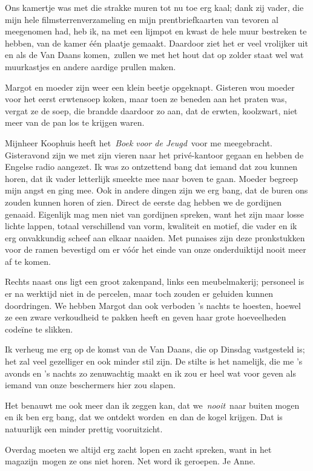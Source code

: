 \documentclass{book}
\begin{document}
Ons kamertje was met die strakke muren tot nu toe erg kaal; dank zij vader, die
mijn hele filmsterrenverzameling en mijn prentbriefkaarten van tevoren al
meegenomen had, heb ik, na met een lijmpot en kwast de hele muur bestreken te
hebben, van de kamer één plaatje gemaakt. Daardoor ziet het er veel vrolijker
uit en als de Van Daans komen,~zullen we met het hout dat op zolder staat wel
wat muurkastjes en andere aardige prullen maken.

Margot en moeder zijn weer een klein beetje opgeknapt. Gisteren wou moeder voor
het eerst erwtensoep koken, maar toen ze beneden aan het praten was, vergat ze
de soep, die brandde daardoor zo aan, dat de erwten, koolzwart, niet meer van de
pan los te krijgen waren.

Mijnheer Koophuis heeft het~\emph{Boek voor de Jeugd}~voor me meegebracht.
Gisteravond zijn we met zijn vieren naar het privé-kantoor gegaan en hebben de
Engelse radio aangezet. Ik was zo ontzettend bang dat iemand dat zou kunnen
horen, dat ik vader letterlijk smeekte mee naar boven te gaan. Moeder begreep
mijn angst en ging mee. Ook in andere dingen zijn we erg bang, dat de buren ons
zouden kunnen horen of zien.  Direct de eerste dag hebben we de gordijnen
genaaid. Eigenlijk mag men niet van gordijnen spreken, want het zijn maar losse
lichte lappen, totaal verschillend van vorm, kwaliteit en motief, die vader en
ik erg onvakkundig scheef aan elkaar naaiden. Met punaises zijn deze
pronkstukken voor de ramen bevestigd om er vóór het einde van onze onderduiktijd
nooit meer af te komen.

Rechts naast ons ligt een groot zakenpand, links een meubelmakerij; personeel is
er na werktijd niet in de percelen, maar toch zouden er geluiden kunnen
doordringen. We hebben Margot dan ook verboden 's nachts te hoesten, hoewel ze
een zware verkoudheid te pakken heeft en geven haar grote hoeveelheden codeïne
te slikken.

Ik verheug me erg op de komst van de Van Daans, die op Dinsdag vastgesteld is;
het zal veel gezelliger en ook minder stil zijn. De stilte is het namelijk, die
me 's avonds en 's nachts zo zenuwachtig maakt en ik zou er heel wat voor geven
als iemand van onze beschermers hier zou slapen.

Het benauwt me ook meer dan ik zeggen kan, dat we~\emph{nooit}~naar buiten mogen
en ik ben erg bang, dat we ontdekt worden~en dan de kogel krijgen. Dat is
natuurlijk een minder prettig vooruitzicht.

Overdag moeten we altijd erg zacht lopen en zacht spreken, want in het
magazijn~mogen ze ons niet horen. Net word ik geroepen. Je Anne.
\end{document}
